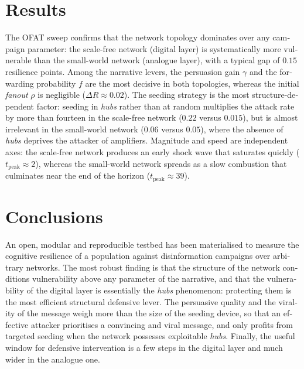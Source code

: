 \documentclass[12pt]{extarticle}
\numberwithin{equation}{section}
\newcommand{\blankpage}{
    \clearpage
    \thispagestyle{empty}
    \mbox{}
    \clearpage
}
\newcommand{\sectionnotoc}[1]{%
    \refstepcounter{section}%
    \section*{\thesection\quad #1}%
}
\newcommand{\resetcounters}{
    \setcounter{section}{0}
    \setcounter{subsection}{0}
    \setcounter{subsubsection}{0}
    \setcounter{figure}{0}
    \setcounter{table}{0}
    \setcounter{equation}{0}
    \setcounter{footnote}{0}
}
\begin{document}
\begin{otherlanguage}{english}
\sectionnotoc{Results}

The OFAT sweep confirms that the network topology dominates over any campaign parameter: the scale-free network (digital layer) is systematically more vulnerable than the small-world network (analogue layer), with a typical gap of $0.15$ resilience points. Among the narrative levers, the persuasion gain $\gamma$ and the forwarding probability $f$ are the most decisive in both topologies, whereas the initial \emph{fanout} $\rho$ is negligible ($\Delta R \approx 0.02$). The seeding strategy is the most structure-dependent factor: seeding in \emph{hubs} rather than at random multiplies the attack rate by more than fourteen in the scale-free network ($0.22$ versus $0.015$), but is almost irrelevant in the small-world network ($0.06$ versus $0.05$), where the absence of \emph{hubs} deprives the attacker of amplifiers. Magnitude and speed are independent axes: the scale-free network produces an early shock wave that saturates quickly ($t_{\text{peak}}\approx 2$), whereas the small-world network spreads as a slow combustion that culminates near the end of the horizon ($t_{\text{peak}}\approx 39$).

\sectionnotoc{Conclusions}

An open, modular and reproducible testbed has been materialised to measure the cognitive resilience of a population against disinformation campaigns over arbitrary networks. The most robust finding is that the structure of the network conditions vulnerability above any parameter of the narrative, and that the vulnerability of the digital layer is essentially the \emph{hubs} phenomenon: protecting them is the most efficient structural defensive lever. The persuasive quality and the virality of the message weigh more than the size of the seeding device, so that an effective attacker prioritises a convincing and viral message, and only profits from targeted seeding when the network possesses exploitable \emph{hubs}. Finally, the useful window for defensive intervention is a few steps in the digital layer and much wider in the analogue one.

\end{otherlanguage}

\blankpage

\resetcounters

\captionsetup[figure]{list=true}
\captionsetup[table]{list=true}

\setcounter{page}{1}

\setcounter{tocdepth}{3}
\tableofcontents
\thispagestyle{fancy}
\newpage
\setcounter{page}{1}
\fancyfoot[C]{
    \begin{center}
        \thepage
    \end{center}
} 
\renewcommand{\footrulewidth}{0.4pt}
\setlength{\footskip}{0.8cm}
\end{document}
